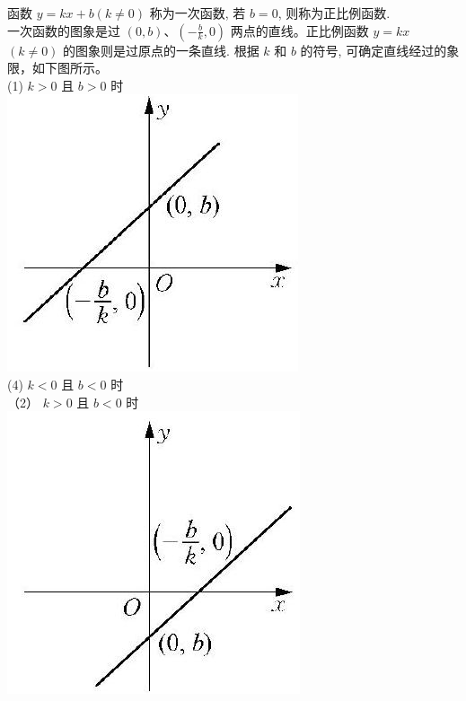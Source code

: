 \documentclass[10pt]{article}
\begin{document}
函数 $y=k x+b(k \neq 0)$ 称为一次函数, 若 $b=0$, 则称为正比例函数.\\
一次函数的图象是过 $(0, b) 、\left(-\frac{b}{k}, 0\right)$ 两点的直线。正比例函数 $y=k x$ $(k \neq 0)$ 的图象则是过原点的一条直线. 根据 $k$ 和 $b$ 的符号, 可确定直线经过的象限，如下图所示。\\
(1) $k>0$ 且 $b>0$ 时\\
\includegraphics[max width=\textwidth, center]{2024_10_30_1bf34f7aeb61f11d11d3g-010(4)}\\
(4) $k<0$ 且 $b<0$ 时\\
（2） $k>0$ 且 $b<0$ 时\\
\includegraphics[max width=\textwidth, center]{2024_10_30_1bf34f7aeb61f11d11d3g-010(1)}\\
\end{document}
